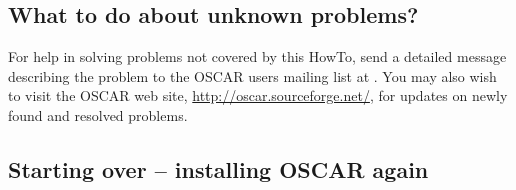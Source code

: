

\subsection{What to do about unknown problems?}

For help in solving problems not covered by this HowTo, send a
detailed message describing the problem to the OSCAR users mailing
list at . You may also wish
to visit the OSCAR web site, \url{http://oscar.sourceforge.net/}, for
updates on newly found and resolved problems.

\subsection{Starting over -- installing OSCAR again}

